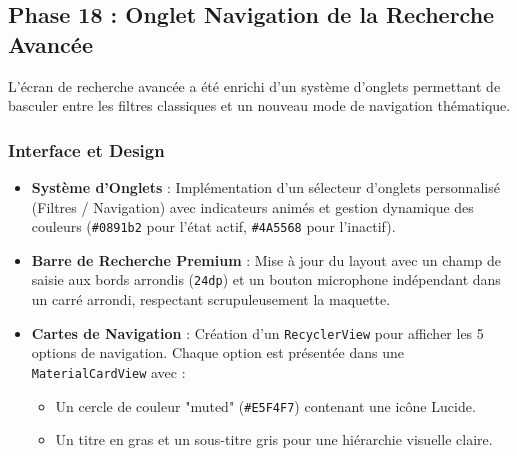 \documentclass{article}
\begin{document}
\subsection{Phase 18 : Onglet Navigation de la Recherche Avancée}
L'écran de recherche avancée a été enrichi d'un système d'onglets permettant de basculer entre les filtres classiques et un nouveau mode de navigation thématique.

\subsubsection{Interface et Design}
\begin{itemize}
    \item \textbf{Système d'Onglets} : Implémentation d'un sélecteur d'onglets personnalisé (Filtres / Navigation) avec indicateurs animés et gestion dynamique des couleurs (\texttt{\#0891b2} pour l'état actif, \texttt{\#4A5568} pour l'inactif).
    \item \textbf{Barre de Recherche Premium} : Mise à jour du layout avec un champ de saisie aux bords arrondis (\texttt{24dp}) et un bouton microphone indépendant dans un carré arrondi, respectant scrupuleusement la maquette.
    \item \textbf{Cartes de Navigation} : Création d'un \texttt{RecyclerView} pour afficher les 5 options de navigation. Chaque option est présentée dans une \texttt{MaterialCardView} avec :
    \begin{itemize}
        \item Un cercle de couleur "muted" (\texttt{\#E5F4F7}) contenant une icône Lucide.
        \item Un titre en gras et un sous-titre gris pour une hiérarchie visuelle claire.
    \end{itemize}
\end{itemize}
\end{document}
